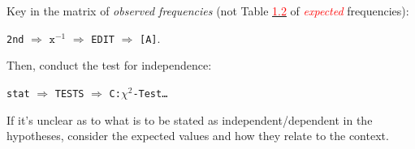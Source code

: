 \documentclass[../Notes.tex]{subfiles}
\begin{document}
\begin{GCSkills}{}
  Key in the matrix of \emph{\textcolor{green!70!black}{observed} frequencies} (not Table \hyperlink{table:tests-of-indepedence}{\textcolor{red}{1.2}} of \emph{\textcolor{red}{expected}} frequencies): 
  \begin{center}
    \texttt{2nd} \(\Longrightarrow\) \(\texttt{x}^{-1}\) \(\Longrightarrow\) \texttt{EDIT} \(\Longrightarrow\) \texttt{[A]}.
  \end{center}
  Then, conduct the test for independence:
  \begin{center}
    \texttt{stat} \(\Longrightarrow\) \texttt{TESTS} \(\Longrightarrow\) \texttt{C:\(\chi^2\)-Test\dots}
  \end{center}
\end{GCSkills}
\begin{note}
  If it's unclear as to what is to be stated as independent/dependent in the hypotheses, consider the expected values and how they relate to the context.  
\end{note}
\end{document}
